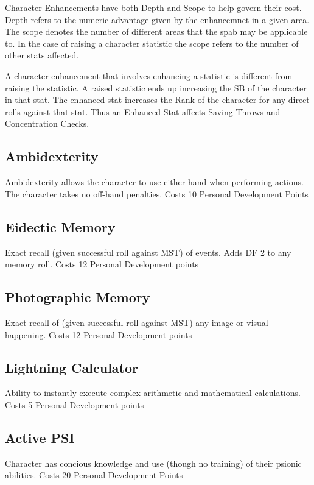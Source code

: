 Character Enhancements have both Depth and Scope to help govern their cost.
Depth refers to the numeric advantage given by the enhancemnet in a given
area. The scope denotes the number of different areas that the spab
may be applicable to. In the case of raising a character statistic the 
scope refers to the number of other stats affected.

A character enhancement that involves enhancing a statistic is different from 
raising the statistic. A raised statistic ends up increasing the SB of the 
character in that stat. The enhanced stat increases the Rank of the 
character for any direct rolls against that stat. Thus an Enhanced Stat
affects Saving Throws and Concentration Checks.

\subsection{Ambidexterity}
Ambidexterity allows the character to use either hand when performing 
actions. The character takes no off-hand penalties.
Costs 10 Personal Development Points

\subsection{Eidectic Memory}
Exact recall (given successful roll against MST) of events. Adds DF 2 to any
memory roll.
Costs 12 Personal Development points

\subsection{Photographic Memory}
Exact recall of (given successful roll against MST) any image or visual
happening.
Costs 12 Personal Development points

\subsection{Lightning Calculator}

Ability to instantly execute complex arithmetic and mathematical
calculations.
Costs 5 Personal Development points

\subsection{Active PSI}

Character has concious knowledge and use (though no training) of their psionic abilities.
Costs 20 Personal Development Points


